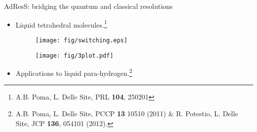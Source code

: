 \documentclass{beamer}
\newcommand{\vect}[1]{\textbf{\textit{#1}}}
\begin{document}
\begin{frame}{AdResS: bridging the quantum and classical resolutions}
  \begin{itemize}
  \item   Liquid tetrahedral molecules.\footnote{
      A.B. Poma, L. Delle Site, PRL \textbf{104}, 250201 }
    \begin{minipage}[m]{0.58\linewidth}
      \begin{figure}
        \texttt{[image: fig/switching.eps]}
      \end{figure}
    \end{minipage}
    \begin{minipage}[m]{0.28\linewidth}
      \begin{figure}
        \texttt{[image: fig/3plot.pdf]}
      \end{figure}
    \end{minipage}\hfill
  \item Applications to liquid para-hydrogen.\footnote{
      A.B. Poma, L. Delle Site, PCCP \textbf{13} 10510 (2011) \&
      R. Potestio, L. Delle Site, JCP \textbf{136}, 054101 (2012).}
  \end{itemize}
\end{frame}









\end{document}
